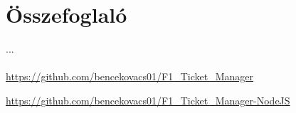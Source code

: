 \chapter*{Összefoglaló}

...\\ \\

\url{https://github.com/bencekovacs01/F1_Ticket_Manager}

\url{https://github.com/bencekovacs01/F1_Ticket_Manager-NodeJS}